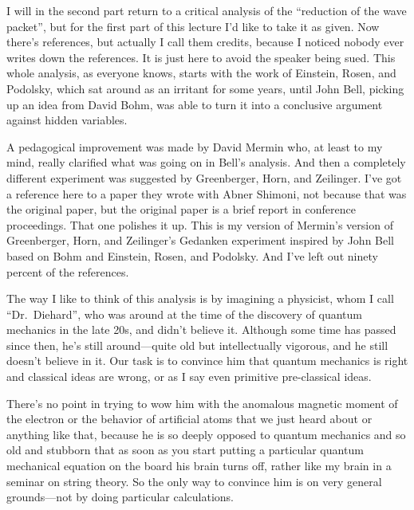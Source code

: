 \documentclass[twocolumn,prb]{revtex4}
\begin{document}
I will in the second part return %
to a critical analysis of the ``reduction of the wave packet'', but for the first part of this lecture I'd like to take it as given. Now there's references, but actually I call them credits, because I noticed nobody ever writes down the references. It is just here to avoid the speaker being sued. This whole analysis, as everyone knows, starts with the work of Einstein, Rosen, and Podolsky\cite{einstein-35pr777}, which sat around as an irritant for some years, until John Bell\cite{bell64physics195,bell66rmp447}, picking up an idea from David Bohm\cite{Bohm51}, was able to turn it into a conclusive argument against hidden variables.

A pedagogical improvement was made by David Mermin\cite{mermin85pt38} who, at least to my mind, really clarified what was going on in Bell's analysis. And then a completely different experiment was suggested by Greenberger, Horn, and Zeilinger. I've got a reference here to a paper they wrote with Abner Shimoni\cite{greenberger-90ajp1131}, not because that was the original paper, but the original paper\cite{greenberger-89proc} is a brief report in conference proceedings. That one polishes it up. This is my version of Mermin's version\cite{mermin90ajp731,mermin90pt9} of Greenberger, Horn, and Zeilinger's\cite{greenberger-89proc} Gedanken experiment inspired by John Bell\cite{bell64physics195} based on Bohm\cite{Bohm51} and Einstein, Rosen, and Podolsky\cite{einstein-35pr777}. And I've left out ninety percent of the references.

The way I like to think of this analysis is by imagining a physicist, whom I call ``Dr.\ Diehard'', who was around at the time of the discovery of quantum mechanics in the late 20s, and didn't believe it. Although some time has passed since then, he's still around---quite old but intellectually vigorous, and he still doesn't believe in it. Our task is to convince him that quantum mechanics is right and classical ideas are wrong, or as I say even primitive pre-classical ideas.

There's no point in trying to wow him with the anomalous magnetic moment of the electron or the behavior of artificial atoms that we just heard about or anything like that, because he is so deeply opposed to quantum mechanics and so old and stubborn that as soon as you start putting a particular quantum mechanical equation on the board his brain turns off, rather like my brain in a seminar on string theory. So the only way to convince him is on very general grounds---not by doing particular calculations.
\end{document}
